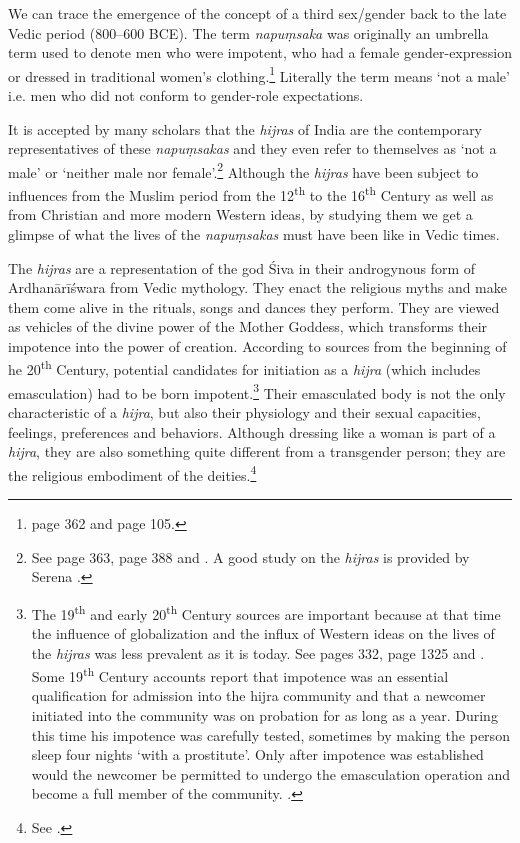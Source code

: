 We can trace the emergence of the concept of a third sex/gender back to the late Vedic period (800–600 BCE). The term {\em napuṃsaka} was originally an umbrella term used to denote men who were impotent, who had a female gender-expression or dressed in traditional women's clothing.\footnote{\cite{zwilling} page 362 and \cite{zwilling2000} page 105.} Literally the term means `not a male' i.e. men who did not conform to gender-role expectations.

It is accepted by many scholars that the {\em hijras} of India are the contemporary representatives of these {\em napuṃsakas} and they even refer to themselves as `not a male' or `neither male nor female'.\footnote{See \cite{zwilling} page 363, \cite{goldman} page 388 and \cite{wendy}. A good study on the {\em hijras} is provided by Serena \cite{nanda}.} Although the {\em hijras} have been subject to influences from the Muslim period from the 12\textsuperscript{th} to the 16\textsuperscript{th} Century as well as from Christian and more modern Western ideas, by studying them we get a glimpse of what the lives of the {\em napuṃsakas} must have been like in Vedic times. 

The {\em hijras} are a representation of the god Śiva in their androgynous form of Ardhanārīśwara from Vedic mythology. They enact the religious myths and make them come alive in the rituals, songs and dances they perform. They are viewed as vehicles of the divine power of the Mother Goddess, which transforms their impotence into the power of creation. According to sources from the beginning of he 20\textsuperscript{th} Century, potential candidates for initiation as a {\em hijra} (which includes emasculation) had to be born impotent.\footnote{The 19\textsuperscript{th} and early 20\textsuperscript{th} Century sources are important because at that time the influence of globalization and the influx of Western ideas on the lives of the {\em hijras} was less prevalent as it is today. See \cite{ibbetson} pages 332, \cite{shah} page 1325 and \cite{bhimbhai}. Some 19\textsuperscript{th} Century accounts report that impotence was an essential qualification for admission into the hijra community and that a newcomer initiated into the community was on probation for as long as a year. During this time his impotence was carefully tested, sometimes by making the person sleep four nights `with a prostitute'. Only after impotence was established would the newcomer be permitted to undergo the emasculation operation and become a full member of the community. \cite{preston}.} Their emasculated body is not the only characteristic of a {\em hijra}, but also their physiology and their sexual capacities, feelings, preferences and behaviors. Although dressing like a woman is part of a {\em hijra}, they are also something quite different from a transgender person; they are the religious embodiment of the deities.\footnote{See \cite{nanda}.}

